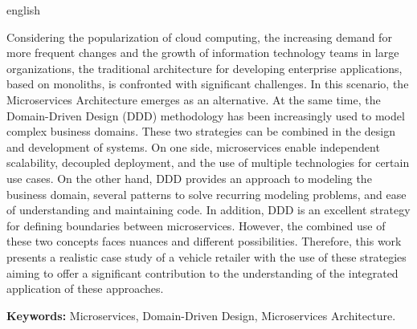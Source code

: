 \begin{resumo}[Abstract]
 \begin{otherlanguage*}{english}


Considering the popularization of cloud computing, the increasing demand for more frequent changes and the growth of information technology teams in large organizations, the traditional architecture for developing enterprise applications, based on monoliths, is confronted with significant challenges. In this scenario, the Microservices Architecture emerges as an alternative. At the same time, the Domain-Driven Design (DDD) methodology has been increasingly used to model complex business domains. These two strategies can be combined in the design and development of systems. On one side, microservices enable independent scalability, decoupled deployment, and the use of multiple technologies for certain use cases. On the other hand, DDD provides an approach to modeling the business domain, several patterns to solve recurring modeling problems, and ease of understanding and maintaining code. In addition, DDD is an excellent strategy for defining boundaries between microservices. However, the combined use of these two concepts faces nuances and different possibilities. Therefore, this work presents a realistic case study of a vehicle retailer  with the use of these strategies aiming to offer a significant contribution to the understanding of the integrated application of these approaches.

\textbf{Keywords: } Microservices, Domain-Driven Design, Microservices Architecture.

\end{otherlanguage*}
\end{resumo}
